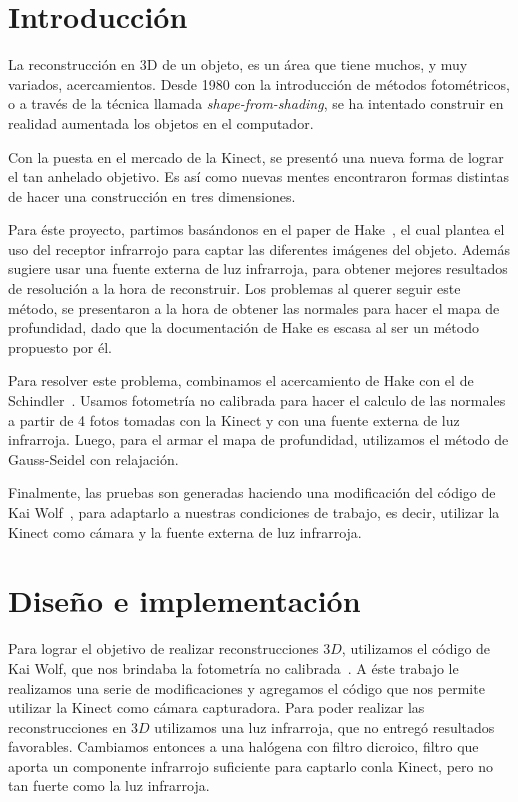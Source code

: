\documentclass[twocolumn,11pts]{IEEEtran}
\begin{document}
\section{Introducción}
La reconstrucción en 3D de un objeto, es un área que tiene muchos, y muy variados, acercamientos. Desde 1980 con la introducción de métodos fotométricos, o a través de la técnica llamada \textit{shape-from-shading}, se ha intentado construir en realidad aumentada los objetos en el computador.

Con la puesta en el mercado de la Kinect, se presentó una nueva forma de lograr el tan anhelado objetivo. Es así como nuevas mentes encontraron formas distintas de hacer una construcción en tres dimensiones.

Para éste proyecto, partimos basándonos en el paper de Hake~\cite{ourpaper}, el cual plantea el uso del receptor infrarrojo para captar las diferentes imágenes del objeto. Además sugiere usar una fuente externa de luz infrarroja, para obtener mejores resultados de resolución a la hora de reconstruir. Los problemas al querer seguir este método, se presentaron a la hora de obtener las normales para hacer el mapa de profundidad, dado que la documentación de Hake es escasa al ser un método propuesto por él. 

Para resolver este problema, combinamos el acercamiento de Hake con el de Schindler~\cite{elotro}. Usamos fotometría no calibrada para hacer el calculo de las normales a partir de 4 fotos tomadas con la Kinect y con una fuente externa de luz infrarroja. Luego, para el armar el mapa de profundidad, utilizamos el método de Gauss-Seidel con relajación.

Finalmente, las pruebas son generadas haciendo una modificación del código de Kai Wolf~\cite{repo}, para adaptarlo a nuestras condiciones de trabajo, es decir, utilizar la Kinect como cámara y la fuente externa de luz infrarroja.
 
\section{Diseño e implementación }
Para lograr el objetivo de realizar reconstrucciones $3D$, utilizamos el código de Kai Wolf, que nos brindaba la fotometría no calibrada~\cite{repo}. A éste trabajo le realizamos una serie de modificaciones y agregamos el código que nos permite utilizar la Kinect como cámara capturadora. Para poder realizar las reconstrucciones en $3D$ utilizamos una luz infrarroja, que no entregó resultados favorables. Cambiamos entonces a una halógena con filtro dicroico, filtro que aporta un componente infrarrojo suficiente para captarlo conla Kinect, pero no tan fuerte como la luz infrarroja.
\end{document}
